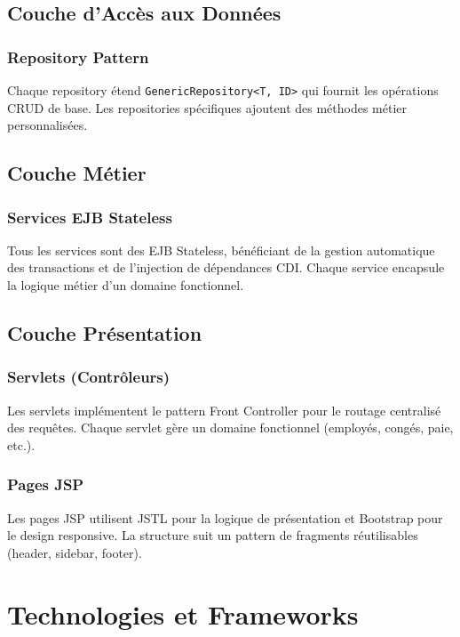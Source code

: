 \documentclass[12pt,a4paper,twoside]{report}
\begin{document}
\section{Couche d'Accès aux Données}

\subsection{Repository Pattern}

Chaque repository étend \texttt{GenericRepository<T, ID>} qui fournit les opérations CRUD de base. Les repositories spécifiques ajoutent des méthodes métier personnalisées.

\section{Couche Métier}

\subsection{Services EJB Stateless}

Tous les services sont des EJB Stateless, bénéficiant de la gestion automatique des transactions et de l'injection de dépendances CDI. Chaque service encapsule la logique métier d'un domaine fonctionnel.

\section{Couche Présentation}

\subsection{Servlets (Contrôleurs)}

Les servlets implémentent le pattern Front Controller pour le routage centralisé des requêtes. Chaque servlet gère un domaine fonctionnel (employés, congés, paie, etc.).

\subsection{Pages JSP}

Les pages JSP utilisent JSTL pour la logique de présentation et Bootstrap pour le design responsive. La structure suit un pattern de fragments réutilisables (header, sidebar, footer).

\chapter{Technologies et Frameworks}
\end{document}
